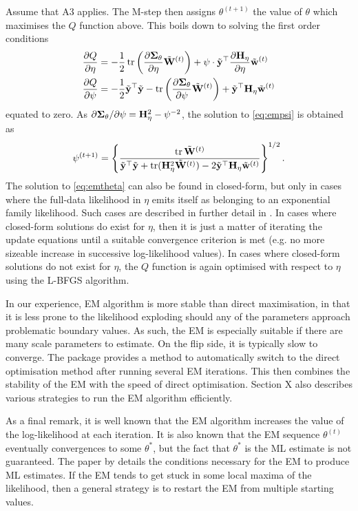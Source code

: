 Assume that A3 applies.
The M-step then assigns $\theta^{(t+1)}$ the value of $\theta$ which maximises the $Q$ function above.
This boils down to solving the first order conditions
%
\begin{align}
  \frac{\partial Q}{\partial\eta}
  &= -\frac{1}{2} \operatorname{tr} \left(\frac{\partial {\bm\Sigma}_\theta}{\partial\eta} \tilde{{\mathbf W}}^{(t)} \right) + \psi \cdot \tilde{{\mathbf y}} ^\top \frac{\partial {\mathbf H}_\eta}{\partial\eta} \tilde{{\mathbf w}}^{(t)} \label{eq:emtheta} \\
  \frac{\partial Q}{\partial\psi}
  &= -\frac{1}{2} \tilde{{\mathbf y}}^\top\tilde{{\mathbf y}} - \operatorname{tr} \left(\frac{\partial {\bm\Sigma}_\theta}{\partial\psi} \tilde{{\mathbf W}}^{(t)} \right) + \tilde{{\mathbf y}}^\top {\mathbf H}_\eta \tilde{{\mathbf w}}^{(t)} \label{eq:empsi}
\end{align}
%
equated to zero.
As $\partial{\bm\Sigma}_\theta/\partial\psi = {\mathbf H}_\eta^2 - \psi^{-2}$, the solution to \eqref{eq:empsi} is obtained as
\begin{align}\label{eq:closedformpsi}
  \psi^{(t+1)} = 
  \left\{ \frac{\operatorname{tr} \tilde{\mathbf W}^{(t)}}{\tilde{{\mathbf y}}^\top\tilde{{\mathbf y}} + \operatorname{tr}({\mathbf H}_\eta^2\tilde{\mathbf W}^{(t)}) - 2\tilde{{\mathbf y}}^\top{\mathbf H}_\eta\tilde{\mathbf w}^{(t)}} \right\}^{1/2}.
\end{align}
The solution to \eqref{eq:emtheta} can also be found in closed-form, but only in cases where the full-data likelihood in $\eta$ emits itself as belonging to an exponential family likelihood.
Such cases are described in further detail in .
In cases where closed-form solutions do exist for $\eta$, then it is just a matter of iterating the update equations until a suitable convergence criterion is met (e.g. no more sizeable increase in successive log-likelihood values).
In cases where closed-form solutions do not exist for $\eta$, the $Q$ function is again optimised with respect to $\eta$ using the L-BFGS algorithm.

In our experience, EM algorithm is more stable than direct maximisation, in that it is less prone to the likelihood exploding should any of the parameters approach problematic boundary values.
As such, the EM is especially suitable if there are many scale parameters to estimate. 
On the flip side, it is typically slow to converge.
The  package provides a method to automatically switch to the direct optimisation method after running several EM iterations.
This then combines the stability of the EM with the speed of direct optimisation.
Section X also describes various strategies to run the EM algorithm efficiently.

As a final remark, it is well known that the EM algorithm increases the value of the log-likelihood at each iteration.
It is also known that the EM sequence $\theta^{(t)}$ eventually convergences to some $\theta^*$, but the fact that $\theta^*$ is the ML estimate is not guaranteed.
The paper by \citet{wu1983convergence} details the conditions necessary for the EM to produce ML estimates.
If the EM tends to get stuck in some local maxima of the likelihood, then a general strategy is to restart the EM from multiple starting values. 


